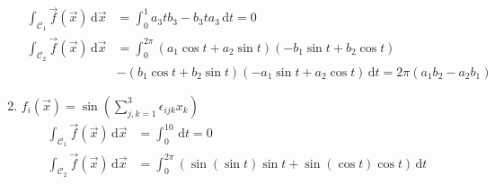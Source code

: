 \documentclass[11pt,answers]{exam}
\begin{document}
\begin{questions}
\begin{solution}
\begin{enumerate}
\begin{align*}
\int_{\mathcal{C}_1}\vec{f}(\vec{x})\,\mathrm d\vec{x}
&=
\int_0^1a_3tb_3-b_3ta_3\,\mathrm dt=0
\\
\int_{\mathcal{C}_2}\vec{f}(\vec{x})\,\mathrm d\vec{x}
&=
\int_0^{2\pi}(a_1\cos t+a_2\sin t)(-b_1\sin t+b_2\cos t)\\
&-(b_1\cos t+b_2\sin t)(-a_1\sin t+a_2\cos t)\,\mathrm dt=2\pi(a_1b_2-a_2b_1)
\end{align*}
\item $f_i(\vec{x})=\sin\left(\sum_{j,k=1}^3\epsilon_{ijk}x_k\right)$
\begin{align*}
\int_{\mathcal{C}_1}\vec{f}(\vec{x})\,\mathrm d\vec{x}
&=
\int_0^10\,\mathrm dt=0
\\
\int_{\mathcal{C}_2}\vec{f}(\vec{x})\,\mathrm d\vec{x}
&=
\int_0^{2\pi}(\sin(\sin t)\sin t+\sin(\cos t)\cos t)\,\mathrm dt
\end{align*}
\end{enumerate}
\end{solution}


%



\end{questions}
\end{document}
